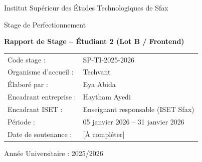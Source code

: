 \begin{titlepage}
\centering
{\Large Institut Supérieur des Études Technologiques de Sfax\par}
\vspace{0.8cm}
{\large Stage de Perfectionnement\par}
\vspace{1.2cm}
{\LARGE \textbf{Rapport de Stage -- Étudiant 2 (Lot B / Frontend)}\par}
\vspace{1.2cm}
\begin{tabular}{ll}
Code stage : & SP-TI-2025-2026 \\
Organisme d'accueil : & Techvant \\
Élaboré par : & Eya Abida \\
Encadrant entreprise : & Haytham Ayedi \\
Encadrant ISET : & Enseignant responsable (ISET Sfax) \\
Période : & 05 janvier 2026 -- 31 janvier 2026 \\
Date de soutenance : & [À compléter]
\end{tabular}
\vfill
Année Universitaire : 2025/2026
\end{titlepage}
